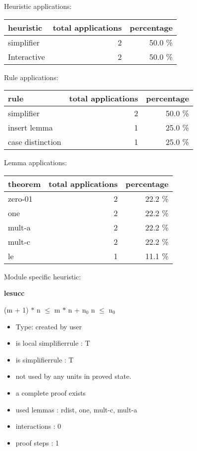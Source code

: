 \documentclass[a4paper]{article}
\begin{document}
\medskip


Heuristic applications:

\begin{supertabular}{l|r|r}
heuristic	& total applications & percentage \\ \hline
simplifier & 2 & 50.0 \% \\
Interactive & 2 & 50.0 \% \\

\end{supertabular}

Rule applications:

\begin{supertabular}{l|r|r}
rule	        & total applications & percentage \\ \hline
simplifier & 2 & 50.0 \% \\
insert lemma & 1 & 25.0 \% \\
case distinction & 1 & 25.0 \% \\

\end{supertabular}

Lemma applications:

\begin{supertabular}{l|r|r}
theorem	        & total applications & percentage \\ \hline
zero-01 & 2 & 22.2 \% \\
one & 2 & 22.2 \% \\
mult-a & 2 & 22.2 \% \\
mult-c & 2 & 22.2 \% \\
le & 1 & 11.1 \% \\

\end{supertabular}

Module specific heuristic:

\pagebreak

{\LARGE\bf lesucc}\label{lemma-lesucc}

\medskip

 \Fol (m + 1) $*$ n $\le$ m $*$ n + $\mbox{n}_{0}$ \Equiv n $\le$ $\mbox{n}_{0}$

\begin{itemize}

\item Type: created by user

\item is local simplifierrule : T
\item is simplifierrule : T
\item not used by any units in proved state.
\item       a complete proof exists
\item       used lemmas  : rdist, one, mult-c, mult-a
\item       interactions : 0
\item       proof steps  : 1
\end{itemize}
\end{document}
